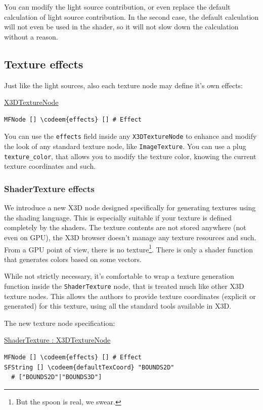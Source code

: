 \documentclass{acmsiggraph}                     %
\newenvironment{mycode}
{\begin{mycodecore}}
{\end{mycodecore}
\vspace{-0.1in}}
\newcommand*{\codeem}[1]{\textbf{#1}}
\begin{document}
You can modify the light source contribution, or even replace the default
calculation of light source contribution. In the second case,
the default calculation will not even be used in the shader,
so it will not slow down the calculation without a reason.

\subsection{Texture effects}

Just like the light sources, also each texture node may define it's own effects:

\begin{mycode}
\underline{X3DTextureNode}
\begin{Verbatim}[commandchars=\\\{\}]
MFNode [] \codeem{effects} [] # Effect
\end{Verbatim}
\end{mycode}

You can use the \texttt{effects} field
inside any \texttt{X3DTextureNode} to enhance and modify the look of any
standard texture node, like \texttt{ImageTexture}.
You can use a plug \texttt{texture\_color},
that allows you to modify the texture color, knowing the current texture
coordinates and such.

\subsubsection{ShaderTexture effects}

We introduce a new X3D node designed specifically for generating
textures using the shading language. This is especially suitable
if your texture is defined completely by the shaders.
The texture contents are not stored anywhere (not even on GPU),
the X3D browser doesn't manage any texture resources and such.
From a GPU point of view, there is no texture\footnote{But the spoon is real,
we swear.}. There is only a shader function that generates colors
based on some vectors.

While not strictly necessary, it's comfortable to wrap a texture generation
function inside the \texttt{ShaderTexture} node, that is treated much
like other X3D texture nodes. This allows the authors to provide texture
coordinates (explicit or generated) for this texture, using all the standard
tools available in X3D.

The new texture node specification:

\begin{mycode}
\underline{ShaderTexture : X3DTextureNode}
\begin{Verbatim}[commandchars=\\\{\}]
MFNode [] \codeem{effects} [] # Effect
SFString [] \codeem{defaultTexCoord} "BOUNDS2D"
  # ["BOUNDS2D"|"BOUNDS3D"]
\end{Verbatim}
\end{mycode}
\end{document}

